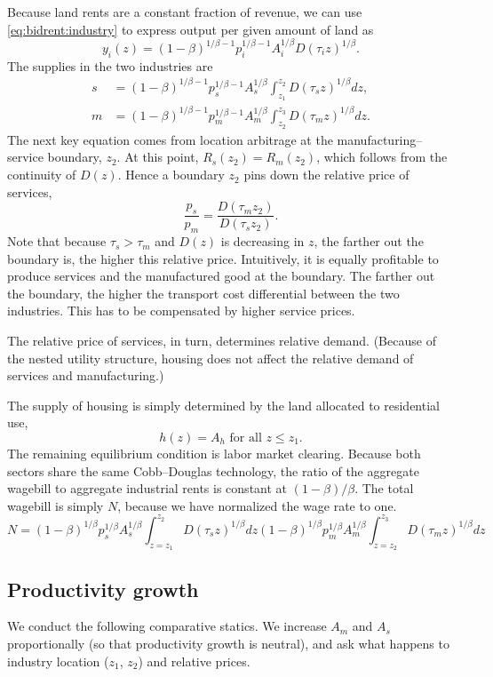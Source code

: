 \documentclass[12pt]{article}
\begin{document}
Because land rents are a constant fraction of revenue, we can use \eqref{eq:bidrent:industry} to express output per given amount of land as
\[
y_i(z) = (1-\beta)^{1/\beta-1} p_i^{1/\beta-1} A_i^{1/\beta} D(\tau_i z)^{1/\beta}.
\]
The supplies in the two industries are
\begin{align}
s &= (1-\beta)^{1/\beta-1} p_s^{1/\beta-1} A_s^{1/\beta} \int_{z_1}^{z_2}D(\tau_s z)^{1/\beta} dz,\label{eq:supply:s} \\
m&= (1-\beta)^{1/\beta-1} p_m^{1/\beta-1} A_m^{1/\beta} \int_{z_2}^{z_3}D(\tau_m z)^{1/\beta} dz.\label{eq:supply:m}
\end{align}
The next key equation comes from location arbitrage at the manufacturing--service boundary, $z_2$. At this point, $R_s(z_2)=R_m(z_2)$, which follows from the continuity of $D(z)$. Hence a boundary $z_2$ pins down the relative price of services,
\begin{equation}\label{eq:arbitrage}
\frac{p_s}{p_m} = \frac{D(\tau_m z_2)}{D(\tau_s z_2)}.
\end{equation}
Note that because $\tau_s>\tau_m$ and $D(z)$ is decreasing in $z$, the farther out the boundary is, the higher this relative price. Intuitively, it is equally profitable to produce services and the manufactured good at the boundary. The farther out the boundary, the higher the transport cost differential between the two industries. This has to be compensated by higher service prices.

The relative price of services, in turn, determines relative demand. (Because of the nested utility structure, housing does not affect the relative demand of services and manufacturing.)

The supply of housing is simply determined by the land allocated to residential use,
\[
h(z) = A_h\text{ for all }z\le z_1.
\]
The remaining equilibrium condition is labor market clearing. Because both sectors share the same Cobb--Douglas technology, the ratio of the aggregate wagebill to aggregate industrial rents is constant at $(1-\beta)/\beta$. The total wagebill is simply $N$, because we have normalized the wage rate to one. 
\begin{equation}\label{eq:labormarket}
N = 
(1-\beta)^{1/\beta} p_s^{1/\beta} A_s^{1/\beta} \int_{z=z_1}^{z_2}D(\tau_s z)^{1/\beta}dz
(1-\beta)^{1/\beta} p_m^{1/\beta} A_m^{1/\beta} \int_{z=z_2}^{z_3}D(\tau_m z)^{1/\beta}dz
\end{equation}
\subsection{Productivity growth}
We conduct the following comparative statics. We increase $A_m$ and $A_s$ proportionally (so that productivity growth is neutral), and ask what happens to industry location ($z_1$, $z_2$) and relative prices.
\end{document}
